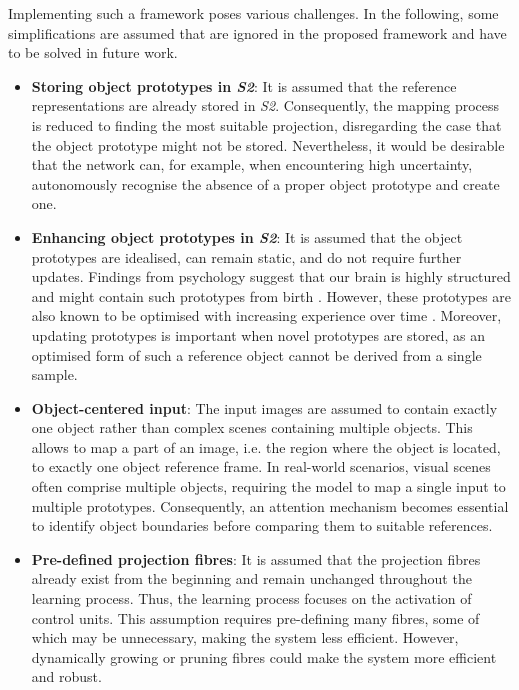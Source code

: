  Implementing such a framework poses various challenges.
In the following, some simplifications are assumed that are ignored in the proposed framework and have to be solved in future work.
\begin{itemize}
    \item \textbf{Storing object prototypes in \emph{S2}}: It is assumed that the reference representations are already stored in \emph{S2}. Consequently, the mapping process is reduced to finding the most suitable projection, disregarding the case that the object prototype might not be stored. Nevertheless, it would be desirable that the network can, for example, when encountering high uncertainty, autonomously recognise the absence of a proper object prototype and create one.
    \item \textbf{Enhancing object prototypes in \emph{S2}}: It is assumed that the object prototypes are idealised, can remain static, and do not require further updates. 
    Findings from psychology suggest that our brain is highly structured and might contain such prototypes from birth . However, these prototypes are also known to be optimised with increasing experience over time \cite{simion_face_2015}.
    Moreover, updating prototypes is important when novel prototypes are stored, as an optimised form of such a reference object cannot be derived from a single sample.
    \item \textbf{Object-centered input}: The input images are assumed to contain exactly one object rather than complex scenes containing multiple objects. This allows to map a part of an image, i.e. the region where the object is located, to exactly one object reference frame. In real-world scenarios, visual scenes often comprise multiple objects, requiring the model to map a single input to multiple prototypes. Consequently, an attention mechanism becomes essential to identify object boundaries before comparing them to suitable references.
    \item \textbf{Pre-defined projection fibres}: It is assumed that the projection fibres already exist from the beginning and remain unchanged throughout the learning process. Thus, the learning process focuses on the activation of control units. This assumption requires pre-defining many fibres, some of which may be unnecessary, making the system less efficient. However, dynamically growing or pruning fibres could make the system more efficient and robust.
\end{itemize}

